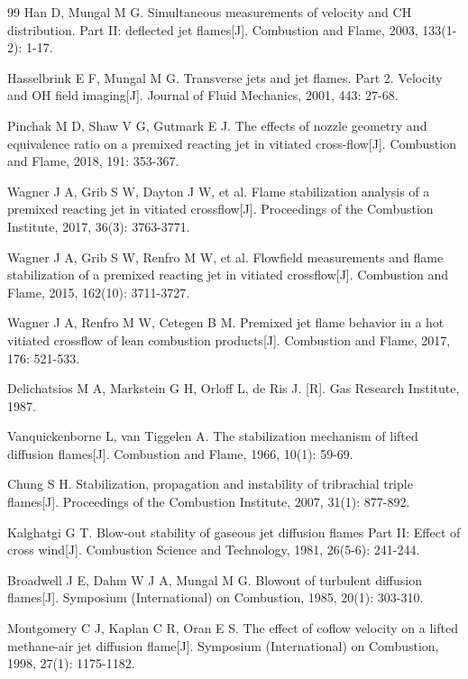 \documentclass[master]{sdustthesis}  %
\begin{document}
\begin{thebibliography}{99}
	 Han D, Mungal M G. Simultaneous measurements of velocity and CH distribution. Part II: deflected jet flames[J]. Combustion and Flame, 2003, 133(1-2): 1-17.
	
	 Hasselbrink E F, Mungal M G. Transverse jets and jet flames. Part 2. Velocity and OH field imaging[J]. Journal of Fluid Mechanics, 2001, 443: 27-68.
	
	 Pinchak M D, Shaw V G, Gutmark E J. The effects of nozzle geometry and equivalence ratio on a premixed reacting jet in vitiated cross-flow[J]. Combustion and Flame, 2018, 191: 353-367.
	
	 Wagner J A, Grib S W, Dayton J W, et al. Flame stabilization analysis of a premixed reacting jet in vitiated crossflow[J]. Proceedings of the Combustion Institute, 2017, 36(3): 3763-3771.
	
	 Wagner J A, Grib S W, Renfro M W, et al. Flowfield measurements and flame stabilization of a premixed reacting jet in vitiated crossflow[J]. Combustion and Flame, 2015, 162(10): 3711-3727.
	
	 Wagner J A, Renfro M W, Cetegen B M. Premixed jet flame behavior in a hot vitiated crossflow of lean combustion products[J]. Combustion and Flame, 2017, 176: 521-533.
	
	 Delichatsios M A, Markstein G H, Orloff L, de Ris J. [R]. Gas Research Institute, 1987.
	
	 Vanquickenborne L, van Tiggelen A. The stabilization mechanism of lifted diffusion flames[J]. Combustion and Flame, 1966, 10(1): 59-69.
	
	 Chung S H. Stabilization, propagation and instability of tribrachial triple flames[J]. Proceedings of the Combustion Institute, 2007, 31(1): 877-892.
	
	 Kalghatgi G T. Blow-out stability of gaseous jet diffusion flames Part II: Effect of cross wind[J]. Combustion Science and Technology, 1981, 26(5-6): 241-244.
	
	 Broadwell J E, Dahm W J A, Mungal M G. Blowout of turbulent diffusion flames[J]. Symposium (International) on Combustion, 1985, 20(1): 303-310.
	
	 Montgomery C J, Kaplan C R, Oran E S. The effect of coflow velocity on a lifted methane-air jet diffusion flame[J]. Symposium (International) on Combustion, 1998, 27(1): 1175-1182.
	

\end{thebibliography}
\end{document}
